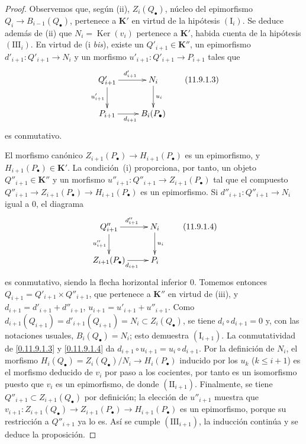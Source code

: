 \begin{proof}
Observemos que, según (ii), $Z_i(Q_\bullet)$, núcleo del epimorfismo $Q_i\to B_{i-1}(Q_\bullet)$, pertenece a $\boldsymbol{K}'$ en virtud de la hipótesis $(\mathrm I_i)$. Se deduce además de (ii) que
$N_i=\operatorname{Ker}(v_i)$
pertenece a $\boldsymbol{K}'$, habida cuenta de la hipótesis $(\mathrm{III}_i)$. En virtud de (i \emph{bis}), existe un $Q'_{i+1}\in\boldsymbol{K}''$, un epimorfismo
$d'_{i+1}:Q'_{i+1}\to N_i$
y un morfismo $u'_{i+1}:Q'_{i+1}\to P_{i+1}$ tales que
\[
\xymatrix{
Q'_{i+1}\ar[r]^{d'_{i+1}}\ar[d]_{u'_{i+1}} &
N_i\ar[d]^{u_i}\\
P_{i+1}\ar[r]_{d_{i+1}} & B_i(P_\bullet)
}
\tag{11.9.1.3}\label{0.11.9.1.3-fr}
\]
es conmutativo.

El morfismo canónico
$Z_{i+1}(P_\bullet)\to H_{i+1}(P_\bullet)$
es un epimorfismo, y $H_{i+1}(P_\bullet)\in\boldsymbol{K}'$.
La condición~(i) proporciona, por tanto, un objeto $Q''_{i+1}\in\boldsymbol{K}''$ y un
morfismo
$u''_{i+1}:Q''_{i+1}\to Z_{i+1}(P_\bullet)$
tal que el compuesto
$Q''_{i+1}\to Z_{i+1}(P_\bullet)\to H_{i+1}(P_\bullet)$
es un epimorfismo.
Si $d''_{i+1}:Q''_{i+1}\to N_i$ igual a $0$, el diagrama
\[
\xymatrix{
Q''_{i+1}\ar[r]^{d''_{i+1}}\ar[d]_{u''_{i+1}} &
N_i\ar[d]^{u_i}\\
Z_{i+1}(P_\bullet)\ar[r]_{d_{i+1}} & P_i
}
\tag{11.9.1.4}\label{0.11.9.1.4-fr}
\]
es conmutativo, siendo la flecha horizontal inferior $0$. Tomemos entonces $Q_{i+1}=Q'_{i+1}\times Q''_{i+1}$, que pertenece a $\boldsymbol{K}''$ en virtud de (iii), y $d_{i+1}=d'_{i+1}+d''_{i+1}$, $u_{i+1}=u'_{i+1}+u''_{i+1}$. Como $d_{i+1}(Q_{i+1})=d'_{i+1}(Q_{i+1})=N_i\subset Z_i(Q_\bullet)$, se tiene $d_i\circ d_{i+1}=0$ y, con las notaciones usuales,
$B_i(Q_\bullet)=N_i$; esto demuestra
$(\mathrm I_{i+1})$.
La conmutatividad de \eqref{0.11.9.1.3} y
\eqref{0.11.9.1.4} da
$d_{i+1}\circ u_{i+1}=u_i\circ d_{i+1}$.
Por la definición de $N_i$, el morfismo
$H_i(Q_\bullet)=Z_i(Q_\bullet)/N_i\to H_i(P_\bullet)$
inducido por los $u_k$ ($k\leq i+1$) es el morfismo deducido de $v_i$ por paso a los cocientes, por tanto es un isomorfismo puesto que $v_i$ es un epimorfismo, de donde $(\mathrm{II}_{i+1})$. Finalmente, se tiene $Q''_{i+1}\subset Z_{i+1}(Q_\bullet)$ por definición; la elección de $u''_{i+1}$ muestra que
$v_{i+1}:Z_{i+1}(Q_\bullet)\to Z_{i+1}(P_\bullet)
\to H_{i+1}(P_\bullet)$
es un epimorfismo, porque su restricción a $Q''_{i+1}$ ya lo
es.
Así se cumple $(\mathrm{III}_{i+1})$, la inducción continúa y se deduce la
proposición.
\end{proof}

